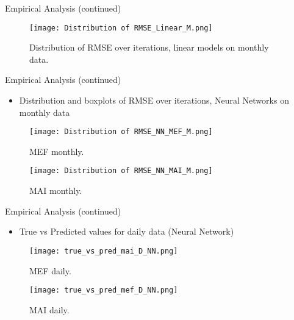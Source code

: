 \documentclass{beamer}
\begin{document}
\begin{frame}{Empirical Analysis (continued)}
  \begin{figure}
    \centering
    \texttt{[image: Distribution of RMSE\_Linear\_M.png]}
    \caption{Distribution of RMSE over iterations, linear models on monthly data.}
    \label{fig:linear_prediction_ii}
  \end{figure}
\end{frame}

\begin{frame}{Empirical Analysis (continued)}
  \begin{itemize}
    \item Distribution and boxplots of RMSE over iterations, Neural Networks
on monthly data
  \end{itemize}
  \begin{figure}[H]
    \centering
    \begin{minipage}{0.48\textwidth}
      \centering
      \texttt{[image: Distribution of RMSE\_NN\_MEF\_M.png]}
      \caption{MEF monthly.}
      \label{fig:linear_prediction}
    \end{minipage}\hfill
    \begin{minipage}{0.48\textwidth}
      \centering
      \texttt{[image: Distribution of RMSE\_NN\_MAI\_M.png]}
      \caption{MAI monthly.}
      \label{fig:nn_prediction}
    \end{minipage}
  \end{figure}
\end{frame}

\begin{frame}{Empirical Analysis (continued)}
  \begin{itemize}
    \item True vs Predicted values for daily data (Neural Network)
  \end{itemize}
  \begin{figure}[H]
    \centering
    \begin{minipage}{0.48\textwidth}
      \centering
      \texttt{[image: true\_vs\_pred\_mai\_D\_NN.png]}
      \caption{MEF daily.}
      \label{fig:linear_prediction}
    \end{minipage}\hfill
    \begin{minipage}{0.48\textwidth}
      \centering
      \texttt{[image: true\_vs\_pred\_mef\_D\_NN.png]}
      \caption{MAI daily.}
      \label{fig:nn_prediction}
    \end{minipage}
  \end{figure}
\end{frame}
\end{document}
